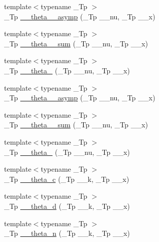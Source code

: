 \begin{DoxyCompactItemize}
\item 
{\footnotesize template$<$typename \+\_\+\+Tp $>$ }\\\+\_\+\+Tp \hyperlink{namespacestd_1_1____detail_ac7207ce23916e29df96b3b2159b55150}{\+\_\+\+\_\+theta\+\_\+\_\+asymp} (\+\_\+\+Tp \+\_\+\+\_\+nu, \+\_\+\+Tp \+\_\+\+\_\+x)
\item 
{\footnotesize template$<$typename \+\_\+\+Tp $>$ }\\\+\_\+\+Tp \hyperlink{namespacestd_1_1____detail_af434f6a07d92577f40f352aa3d44483c}{\+\_\+\+\_\+theta\+\_\+\_\+sum} (\+\_\+\+Tp \+\_\+\+\_\+nu, \+\_\+\+Tp \+\_\+\+\_\+x)
\item 
{\footnotesize template$<$typename \+\_\+\+Tp $>$ }\\\+\_\+\+Tp \hyperlink{namespacestd_1_1____detail_a6f965c639307555e5979b954a11ca0b8}{\+\_\+\+\_\+theta\+\_} (\+\_\+\+Tp \+\_\+\+\_\+nu, \+\_\+\+Tp \+\_\+\+\_\+x)
\item 
{\footnotesize template$<$typename \+\_\+\+Tp $>$ }\\\+\_\+\+Tp \hyperlink{namespacestd_1_1____detail_a975a9a52a8a483849dd0877c24ca5d74}{\+\_\+\+\_\+theta\+\_\+\_\+asymp} (\+\_\+\+Tp \+\_\+\+\_\+nu, \+\_\+\+Tp \+\_\+\+\_\+x)
\item 
{\footnotesize template$<$typename \+\_\+\+Tp $>$ }\\\+\_\+\+Tp \hyperlink{namespacestd_1_1____detail_a3dc1b5188464b81b6acbb2983ef0f77c}{\+\_\+\+\_\+theta\+\_\+\_\+sum} (\+\_\+\+Tp \+\_\+\+\_\+nu, \+\_\+\+Tp \+\_\+\+\_\+x)
\item 
{\footnotesize template$<$typename \+\_\+\+Tp $>$ }\\\+\_\+\+Tp \hyperlink{namespacestd_1_1____detail_a274d3801b84bcaad13c274c8bab32bcc}{\+\_\+\+\_\+theta\+\_} (\+\_\+\+Tp \+\_\+\+\_\+nu, \+\_\+\+Tp \+\_\+\+\_\+x)
\item 
{\footnotesize template$<$typename \+\_\+\+Tp $>$ }\\\+\_\+\+Tp \hyperlink{namespacestd_1_1____detail_af95cdf16bfcf6c138d621b0c518a3299}{\+\_\+\+\_\+theta\+\_\+c} (\+\_\+\+Tp \+\_\+\+\_\+k, \+\_\+\+Tp \+\_\+\+\_\+x)
\item 
{\footnotesize template$<$typename \+\_\+\+Tp $>$ }\\\+\_\+\+Tp \hyperlink{namespacestd_1_1____detail_ad4ca29063a2f624e185592497d37a670}{\+\_\+\+\_\+theta\+\_\+d} (\+\_\+\+Tp \+\_\+\+\_\+k, \+\_\+\+Tp \+\_\+\+\_\+x)
\item 
{\footnotesize template$<$typename \+\_\+\+Tp $>$ }\\\+\_\+\+Tp \hyperlink{namespacestd_1_1____detail_aace76210c8f70761bb14ab602b88d027}{\+\_\+\+\_\+theta\+\_\+n} (\+\_\+\+Tp \+\_\+\+\_\+k, \+\_\+\+Tp \+\_\+\+\_\+x)

\end{DoxyCompactItemize}
